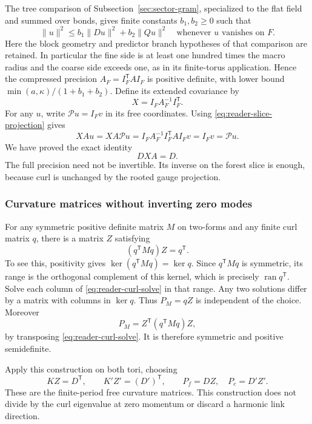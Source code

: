 The tree comparison of Subsection~\ref{sec:sector-gram}, specialized
to the flat field and summed over bonds, gives finite constants
$b_1,b_2\ge0$ such that
\[
 \|u\|^2\le b_1\|Du\|^2+b_2\|Qu\|^2
 \quad\text{whenever }u\text{ vanishes on }F.
\]
Here the block geometry and predictor branch hypotheses of that
comparison are retained. In particular the fine side is at least
one hundred times the macro radius and the coarse side exceeds one,
as in its finite-torus application. Hence the compressed precision
$A_F=I_F^{\mathsf T}AI_F$ is positive definite, with lower bound
$\min(a,\kappa)/(1+b_1+b_2)$. Define its extended covariance by
\[
 X=I_FA_F^{-1}I_F^{\mathsf T}.
\]
For any $u$, write $\mathcal Pu=I_Fv$ in its free coordinates.
Using \eqref{eq:reader-slice-projection} gives
\[
 XAu=XA\mathcal Pu
 =I_FA_F^{-1}I_F^{\mathsf T}AI_Fv=I_Fv=\mathcal Pu.
\]
We have proved the exact identity
\begin{equation}\label{eq:reader-curl-through}
 DXA=D.
\end{equation}
The full precision need not be invertible. Its inverse on the
forest slice is enough, because curl is unchanged by the rooted
gauge projection.

\subsubsection{Curvature matrices without inverting zero modes}

For any symmetric positive definite matrix $M$ on two-forms and
any finite curl matrix $q$, there is a matrix $Z$ satisfying
\begin{equation}\label{eq:reader-curl-solve}
 (q^{\mathsf T}Mq)Z=q^{\mathsf T}.
\end{equation}
To see this, positivity gives
$\ker(q^{\mathsf T}Mq)=\ker q$. Since $q^{\mathsf T}Mq$ is
symmetric, its range is the orthogonal complement of this kernel,
which is precisely $\operatorname{ran}q^{\mathsf T}$. Solve each
column of \eqref{eq:reader-curl-solve} in that range.
Any two solutions differ by a matrix with columns in $\ker q$.
Thus $P_M=qZ$ is independent of the choice. Moreover
\[
 P_M=Z^{\mathsf T}(q^{\mathsf T}Mq)Z,
\]
by transposing \eqref{eq:reader-curl-solve}. It is therefore
symmetric and positive semidefinite.

Apply this construction on both tori, choosing
\[
 KZ=D^{\mathsf T},\qquad K'Z'=(D')^{\mathsf T},\qquad
 P_f=DZ,\quad P_c=D'Z'.
\]
These are the finite-period free curvature matrices. This
construction does not divide by the curl eigenvalue at zero
momentum or discard a harmonic link direction.

